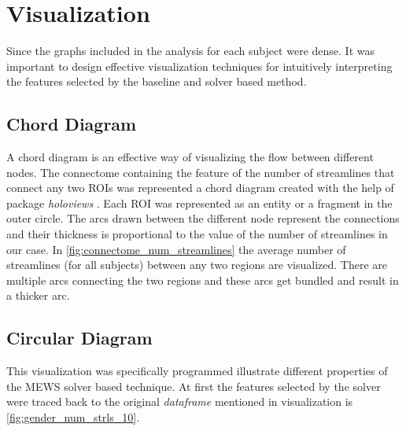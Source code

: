\documentclass[msthesis.tex]{subfiles}
\begin{document}
\section{Visualization}
Since the graphs included in the analysis for each subject were dense. It was important to design effective visualization techniques for intuitively interpreting the features selected by the baseline and solver based method. 

\subsection{Chord Diagram}
A chord diagram is an effective way of visualizing the flow between different nodes. The connectome containing the feature of the number of streamlines that connect any two ROIs was represented a chord diagram created with the help of package \textit{holoviews} \citep{stevens2015holoviews}. Each ROI was represented as an entity or a fragment in the outer circle. The arcs drawn between the different node represent the connections and their thickness is proportional to the value of the number of streamlines in our case. In \autoref{fig:connectome_num_streamlines} the average number of streamlines (for all subjects) between any two regions are visualized. There are multiple arcs connecting the two regions and these arcs get bundled and result in a thicker arc.

\subsection{Circular Diagram}
This visualization was specifically programmed illustrate different properties of the \gls{MEWS} solver based technique. At first the features selected by the solver were traced back to the original \textit{dataframe} mentioned in 
visualization is \autoref{fig:gender_num_strls_10}.
\end{document}
